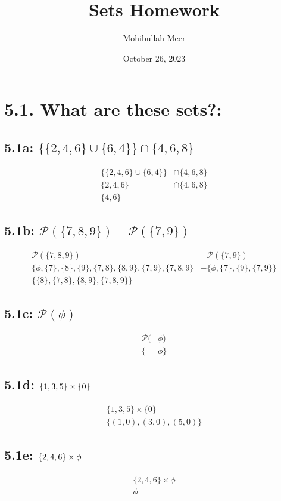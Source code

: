 \documentclass{article}
\title{Sets Homework}
\author{Mohibullah Meer}
\date{October 26, 2023}
\begin{document}
\maketitle
\section*{5.1. What are these sets?:}
\subsection*{5.1a: $\{\{2,4,6\}\cup\{6,4\}\}\cap\{4,6,8\}$}
\begin{align*}
  \{\{2,4,6\}\cup\{6,4\}\}&\cap\{4,6,8\}\\
  \{2,4,6\}&\cap\{4,6,8\}\\
  \{4,6\}
\end{align*}
\subsection*{5.1b: $\mathcal{P}(\{7,8,9\})-\mathcal{P}(\{7,9\})$}
\begin{align*}
  \mathcal{P}(\{7,8,9\})&-\mathcal{P}(\{7,9\})\\
  \{\phi,\{7\},\{8\},\{9\},\{7,8\},\{8,9\},\{7,9\},\{7,8,9\}&-\{\phi,\{7\},\{9\},\{7,9\}\}\\
  \{\{8\},\{7,8\},\{8,9\},\{7,8,9\}\}
\end{align*}
\subsection*{5.1c: $\mathcal{P}(\phi)$}
\begin{align*}
  \mathcal{P}(&\phi)\\
  \{&\phi\}
\end{align*}
\subsection*{5.1d: $\{1, 3, 5\}\times\{0\}\\$}
\begin{align*}
  \{1, 3, 5\}\times\{0\}\\
  \{(1,0),(3,0),(5,0)\}
\end{align*}
\subsection*{5.1e: $\{2,4,6\}\times\phi\\$}
\begin{align*}
  \{2,4,6\}\times\phi\\
  \phi
\end{align*}
\end{document}
